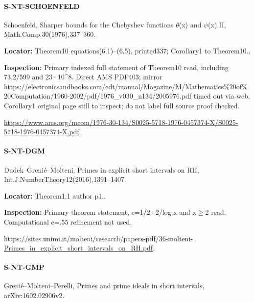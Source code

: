\documentclass[11pt,a4paper]{article}
\begin{document}
\paragraph{S-NT-SCHOENFELD} Schoenfeld, Sharper bounds for the Chebyshev functions \ensuremath{\theta}(x) and \ensuremath{\psi}(x).\allowbreak{}II, Math.\allowbreak{}Comp.\allowbreak{}30(1976),337–\allowbreak{}360.

\textbf{Locator:} Theorem10 equations(6.\allowbreak{}1)–\allowbreak{}(6.\allowbreak{}5), printed337; Corollary1 to Theorem10.\allowbreak{}.

\textbf{Inspection:} Primary indexed full statement of Theorem10 read, including 73.\allowbreak{}2/\allowbreak{}599 and 23·10\textasciicircum{}8.\allowbreak{} Direct AMS PDF403; mirror https:\allowbreak{}/\allowbreak{}/\allowbreak{}electronicsandbooks.\allowbreak{}com/\allowbreak{}edt/\allowbreak{}manual/\allowbreak{}Magazine/\allowbreak{}M/\allowbreak{}Mathematics\%20of\%20Computation/\allowbreak{}1960-2002/\allowbreak{}pdf/\allowbreak{}1976\_\allowbreak{}v030\_\allowbreak{}n134/\allowbreak{}2005976.\allowbreak{}pdf timed out via web.\allowbreak{} Corollary1 original page still to inspect; do not label full source proof checked.\allowbreak{}

\url{https://www.ams.org/mcom/1976-30-134/S0025-5718-1976-0457374-X/S0025-5718-1976-0457374-X.pdf}.

\paragraph{S-NT-DGM} Dudek–\allowbreak{}Grenié–\allowbreak{}Molteni, Primes in explicit short intervals on RH, Int.\allowbreak{}J.\allowbreak{}NumberTheory12(2016),1391–\allowbreak{}1407.

\textbf{Locator:} Theorem1.\allowbreak{}1 author p1.\allowbreak{}.

\textbf{Inspection:} Primary theorem statement, c=1/\allowbreak{}2+2/\allowbreak{}log x and x\ensuremath{\ge}2 read.\allowbreak{} Computational c=.\allowbreak{}55 refinement not used.\allowbreak{}

\url{https://sites.unimi.it/molteni/research/papers-pdf/36-molteni-Primes_in_explicit_short_intervals_on_RH.pdf}.

\paragraph{S-NT-GMP} Grenié–\allowbreak{}Molteni–\allowbreak{}Perelli, Primes and prime ideals in short intervals, arXiv:\allowbreak{}1602.\allowbreak{}02906v2.
\end{document}
